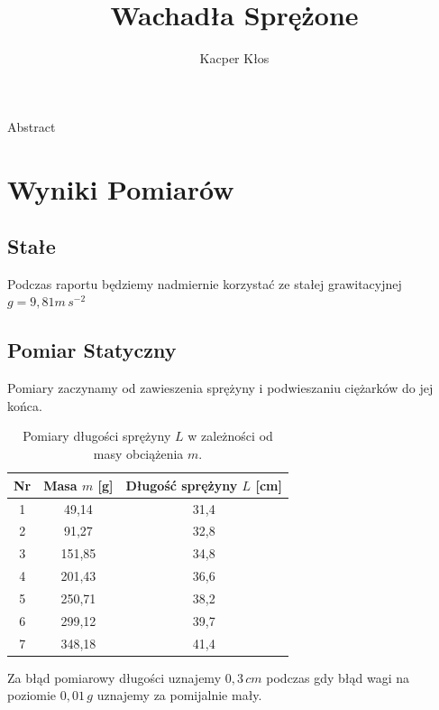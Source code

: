 \documentclass[12pt]{article}
\title{Wachadła Sprężone}
\author{Kacper Kłos}
\begin{document}
\maketitle

Abstract

\newpage
\section{Wyniki Pomiarów}

\subsection{Stałe}
Podczas raportu będziemy nadmiernie korzystać ze stałej grawitacyjnej \(g = 9{,}81 m \, s^{-2}\)

\subsection{Pomiar Statyczny}
Pomiary zaczynamy od zawieszenia sprężyny i podwieszaniu ciężarków do jej końca. 
\begin{table}[H]
    \centering
    \begin{tabular}{c|cc}
        \toprule
        \textbf{Nr} & Masa $m$ [g] & Długość sprężyny $L$ [cm] \\
        \midrule
        1  & 49{,}14  & 31{,}4 \\
        2  & 91{,}27  & 32{,}8 \\
        3  & 151{,}85 & 34{,}8 \\
        4  & 201{,}43 & 36{,}6 \\
        5  & 250{,}71 & 38{,}2 \\
        6  & 299{,}12 & 39{,}7 \\
        7  & 348{,}18 & 41{,}4 \\
        \bottomrule
    \end{tabular}
    \caption{Pomiary długości sprężyny $L$ w zależności od masy obciążenia $m$.}
    \label{tab:spring_mass}
\end{table}
Za błąd pomiarowy długości uznajemy $0{,}3 \, cm$ podczas gdy błąd wagi na poziomie $0{,}01 \, g$ uznajemy za pomijalnie mały.
\end{document}
